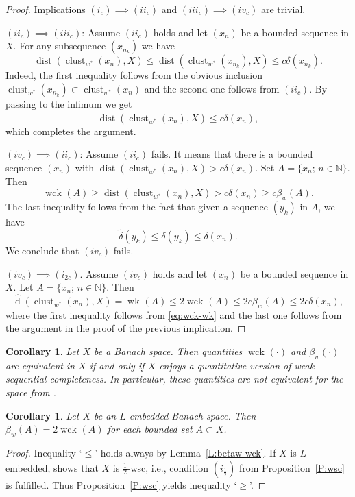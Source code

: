 \documentclass{amsart}
\numberwithin{equation}{section}
\newtheorem{cor}[thm]{Corollary}
\theoremstyle{definition}
\def\en{\mathbb N}
\def\dist{\operatorname{dist}}
\def\dh{\widehat{\operatorname{d}}}
\def\clu#1{\operatorname{clust}_{w^*}(#1)}
\def\wde#1{\widetilde{\delta}\left(#1\right)}
\def\de#1{\delta\left(#1\right)}
\newcommand{\wk}[2][]{\operatorname{wk}_{#1}\left(#2\right)}
\newcommand{\wck}[2][]{\operatorname{wck}_{#1}\left(#2\right)}
\newcommand{\setsep}{;\,}
\begin{document}
\begin{proof}
    Implications $(i_c)\implies(ii_c)$ and $(iii_c)\implies(iv_c)$ are trivial. 

    $(ii_c)\implies(iii_c)$: Assume $(ii_c)$ holds and let $(x_n)$ be a bounded sequence in $X$. For any subsequence $(x_{n_k})$ we have
    $$\dist(\clu{x_n},X)\le \dist(\clu{x_{n_k}},X)\le c\de{x_{n_k}}.$$
    Indeed, the first inequality follows from the obvious inclusion $\clu{x_{n_k}}\subset\clu{x_n}$ and the second one follows from $(ii_c)$. By passing to the infimum we get
     $$\dist(\clu{x_n},X)\le  c\wde{x_{n}},$$ which completes the argument.

     $(iv_c)\implies (ii_c)$: Assume $(ii_c)$ fails. It means that there is a bounded sequence $(x_n)$ with $\dist(\clu{x_n},X)> c\de{x_n}$. Set $A=\{x_n\setsep n\in \en\}$. Then
     $$\wck{A}\ge \dist(\clu{x_n},X)> c\de{x_n}\ge c\beta_w(A).$$
     The last inequality follows from the fact that given a sequence $(y_k)$ in $A$, we have
     $$\wde{y_k}\le\de{y_k}\le \de{x_n}.$$
     We conclude that $(iv_c)$ fails.

     $(iv_c)\implies (i_{2c})$. Assume $(iv_c)$ holds and let $(x_n)$ be a bounded sequence in $X$. Let $A=\{x_n\setsep n\in\en\}$. Then
     $$\dh(\clu{x_n},X)=\wk{A}\le2\wck{A}\le2c\beta_w(A)\le2c\de{x_n},$$
     where the first inequality follows from \eqref{eq:wck-wk} and the last one follows from the argument in the proof of the previous implication.
\end{proof}

\begin{cor}\label{cor:qwsc}
    Let $X$ be a Banach space. Then quantities $\wck{\cdot}$ and $\beta_w(\cdot)$ are equivalent in $X$ if and only if $X$ enjoys a quantitative version of weak sequential completeness. In particular, these quantities are not equivalent for the space from \cite[Example 4]{wesecom}.
\end{cor}

\begin{cor}\label{cor:Lembedded}
     Let $X$ be an $L$-embedded Banach space. Then $\beta_w(A)=2\wck{A}$ for each bounded set $A\subset X$.
\end{cor}

\begin{proof}
    Inequality `$\le$' holds always by Lemma~\ref{L:betaw-wck}. If $X$ is $L$-embedded, \cite[Theorem 1]{wesecom} shows that $X$ is $\frac12$-wsc, i.e., condition $(i_{\frac12})$ from Proposition~\ref{P:wsc} is fulfilled. Thus Proposition~\ref{P:wsc} yields inequality `$\ge$'.
\end{proof}
\end{document}
